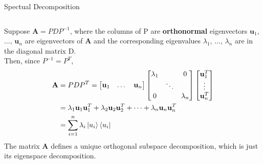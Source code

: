 \documentclass{beamer}
\begin{document}
\begin{frame}{Spectual Decomposition}
  {\tiny
    \begin{columns}
    Suppose $\mathbf{A} = PDP^{-1}$,
    where the columns of P are \textbf{orthonormal} eigenvectors $\mathbf{u}_1$, $\dots$, $\mathbf{u}_n$ are eigenvectors of $\mathbf{A}$
    and the corresponding eigenvalues $\lambda_1$, $\dots$, $\lambda_n$ are in the diagonal matrix D. \\
    Then, since $P^{-1} = P^T$,
    \begin{align*}
      \mathbf{A} &= PDP^T =
                            \begin{bmatrix}
                              \mathbf{u}_1 & \dots & \mathbf{u}_n
                            \end{bmatrix}
                            \begin{bmatrix}
                              \lambda_1 &  & 0 \\
                              & \ddots & \\
                              0 & &  \lambda_n
                            \end{bmatrix}
                            \begin{bmatrix}
                              \mathbf{u}^{T}_1 \\
                              \vdots \\
                              \mathbf{u}^{T}_n
                            \end{bmatrix} \\
                  &=   \lambda_1\mathbf{u}_1\mathbf{u}^{T}_1
                     + \lambda_2\mathbf{u}_2\mathbf{u}^{T}_2
                     + \dots
                     + \lambda_n\mathbf{u}_n\mathbf{u}^{T}_n \\
                     &= \sum\limits_{i=1}^n \lambda_i\ket{u_i}\bra{u_i}
    \end{align*}
    The matrix $\mathbf{A}$ defines a unique orthogonal subspace decomposition, which is just its eigenspace decomposition.


\end{columns}}
\end{frame}
\end{document}
